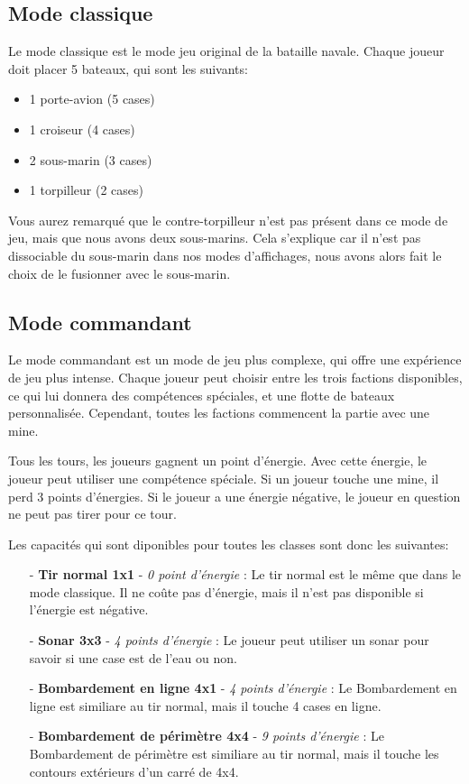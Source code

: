 \documentclass[../besoin_user.tex]{subfiles}
\begin{document}
\subsection{Mode classique}
Le mode classique est le mode jeu original de la bataille navale. Chaque joueur doit placer 5 bateaux, qui sont les suivants:
\begin{itemize}
    \item 1 porte-avion (5 cases)
    \item 1 croiseur (4 cases)
    \item 2 sous-marin (3 cases)
    \item 1 torpilleur (2 cases)
\end{itemize}
Vous aurez remarqué que le contre-torpilleur n'est pas présent dans ce mode de jeu, mais que nous avons deux sous-marins. Cela s'explique car il n'est pas
dissociable du sous-marin dans nos modes d'affichages, nous avons alors fait le choix de le fusionner avec le sous-marin.

\subsection{Mode commandant}
Le mode commandant est un mode de jeu plus complexe, qui offre une expérience de jeu plus intense. Chaque joueur peut choisir entre les trois factions disponibles,
ce qui lui donnera des compétences spéciales, et une flotte de bateaux personnalisée. Cependant, toutes les factions commencent la partie avec une mine.

Tous les tours, les joueurs gagnent un point d'énergie. Avec cette énergie, le joueur peut utiliser une compétence spéciale.
Si un joueur touche une mine, il perd 3 points d'énergies. Si le joueur a une énergie négative, le joueur en question ne peut pas tirer pour ce tour.

Les capacités qui sont diponibles pour toutes les classes sont donc les suivantes:
\begin{itemize}
    \item[-] \textbf{Tir normal 1x1} - \textit{0 point d'énergie} : Le tir normal est le même que dans le mode classique. Il ne coûte pas d'énergie, mais il n'est pas disponible si l'énergie est négative.
    \item[-] \textbf{Sonar 3x3} - \textit{4 points d'énergie} : Le joueur peut utiliser un sonar pour savoir si une case est de l'eau ou non.
    \item[-] \textbf{Bombardement en ligne 4x1} - \textit{4 points d'énergie} : Le Bombardement en ligne est similiare au tir normal, mais il touche 4 cases en ligne.
    \item[-] \textbf{Bombardement de périmètre 4x4} - \textit{9 points d'énergie} : Le Bombardement de périmètre est similiare au tir normal, mais il touche les contours extérieurs d'un carré de 4x4.
\end{itemize}
\end{document}
